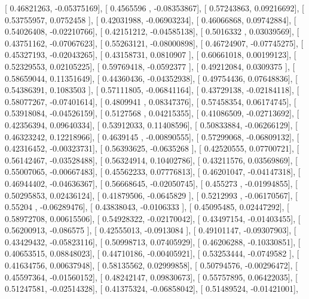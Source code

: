 \documentclass{article}
\begin{document}
       [ 0.46821263, -0.05375169],
       [ 0.4565596 , -0.08353867],
       [ 0.57243863,  0.09216692],
       [ 0.53755957,  0.0752458 ],
       [ 0.42031988, -0.06903234],
       [ 0.46066868,  0.09742884],
       [ 0.54026408, -0.02210766],
       [ 0.42151212, -0.04585138],
       [ 0.5016332 ,  0.03039569],
       [ 0.43751162, -0.07067623],
       [ 0.55263121, -0.08000898],
       [ 0.46724907, -0.07745275],
       [ 0.45327193, -0.02043265],
       [ 0.43158731,  0.0810907 ],
       [ 0.60661018,  0.00199123],
       [ 0.52329553,  0.02105225],
       [ 0.59769418, -0.0592377 ],
       [ 0.49212084,  0.0309375 ],
       [ 0.58659044,  0.11351649],
       [ 0.44360436, -0.04352938],
       [ 0.49754436,  0.07648836],
       [ 0.54386391,  0.1083503 ],
       [ 0.57111805, -0.06841164],
       [ 0.43729138, -0.02184118],
       [ 0.58077267, -0.07401614],
       [ 0.4809941 ,  0.08347376],
       [ 0.57458354,  0.06174745],
       [ 0.53918084, -0.04526159],
       [ 0.5127568 ,  0.04215355],
       [ 0.41086509, -0.02713692],
       [ 0.42356394,  0.09640334],
       [ 0.53912033,  0.11408596],
       [ 0.50833884, -0.06266129],
       [ 0.46323242,  0.12218966],
       [ 0.4639145 , -0.00890555],
       [ 0.57299068, -0.06809132],
       [ 0.42316452, -0.00323731],
       [ 0.56393625, -0.0635268 ],
       [ 0.42520555,  0.07700721],
       [ 0.56142467, -0.03528488],
       [ 0.56324914,  0.10402786],
       [ 0.43211576,  0.03569869],
       [ 0.55007065, -0.00667483],
       [ 0.45562233,  0.07776813],
       [ 0.46201047, -0.04147318],
       [ 0.46944402, -0.04636367],
       [ 0.56668645, -0.02050745],
       [ 0.455273  , -0.01994855],
       [ 0.50295853,  0.02436124],
       [ 0.41879506, -0.0645829 ],
       [ 0.5212993 , -0.06170567],
       [ 0.55204   , -0.06289476],
       [ 0.43838043, -0.0106333 ],
       [ 0.45095485,  0.02447292],
       [ 0.58972708,  0.00615506],
       [ 0.54928322, -0.02170042],
       [ 0.43497154, -0.01403455],
       [ 0.56200913, -0.086575  ],
       [ 0.42555013, -0.0913084 ],
       [ 0.49101147, -0.09307903],
       [ 0.43429432, -0.05823116],
       [ 0.50998713,  0.07405929],
       [ 0.46206288, -0.10330851],
       [ 0.40653515,  0.08848023],
       [ 0.44710186, -0.00405921],
       [ 0.53253444, -0.0749582 ],
       [ 0.41634756,  0.00637948],
       [ 0.58135562,  0.02999858],
       [ 0.50794576, -0.00296472],
       [ 0.45597364, -0.01560152],
       [ 0.48242147,  0.09830673],
       [ 0.55757895,  0.06422035],
       [ 0.51247581, -0.02514328],
       [ 0.41375324, -0.06858042],
       [ 0.51489524, -0.01421001],
\end{document}
